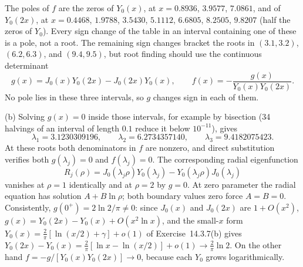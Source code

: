 The poles of $f$ are the zeros of $Y_0(x)$, at
$x=0.8936$, $3.9577$, $7.0861$, and of $Y_0(2x)$, at
$x=0.4468$, $1.9788$, $3.5430$, $5.1112$, $6.6805$, $8.2505$,
$9.8207$ (half the zeros of $Y_0$). Every sign change of the table
in an interval containing one of these is a pole, not a root. The
remaining sign changes bracket the roots in $(3.1,3.2)$,
$(6.2,6.3)$, and $(9.4,9.5)$, but root finding should use the
continuous determinant
\[
g(x)=J_0(x)Y_0(2x)-J_0(2x)Y_0(x),\qquad
f(x)=-\frac{g(x)}{Y_0(x)Y_0(2x)}.
\]
No pole lies in these three intervals, so $g$ changes sign in each
of them.

(b) Solving $g(x)=0$ inside those intervals, for example by
bisection (34 halvings of an interval of length $0.1$ reduce it below
$10^{-11}$), gives
\[
\boxed{\lambda_1=3.1230309196,\qquad
\lambda_2=6.2734357140,\qquad
\lambda_3=9.4182075423}.
\]
At these roots both denominators in $f$ are nonzero, and direct
substitution verifies both $g(\lambda_j)=0$ and $f(\lambda_j)=0$.
The corresponding radial eigenfunction
\[
R_j(\rho)=J_0(\lambda_j\rho)Y_0(\lambda_j)
-Y_0(\lambda_j\rho)J_0(\lambda_j)
\]
vanishes at $\rho=1$ identically and at $\rho=2$ by $g=0$.
At zero parameter the radial equation has solution $A+B\ln\rho$;
both boundary values zero force $A=B=0$. Consistently,
$g(0^+)=2\ln2/\pi\ne0$: since $J_0(x)$ and $J_0(2x)$ are $1+O(x^2)$,
$g(x)=Y_0(2x)-Y_0(x)+O(x^2\ln x)$, and the small-$x$ form
$Y_0(x)=\frac2\pi[\ln(x/2)+\gamma]+o(1)$ of Exercise~14.3.7(b) gives
$Y_0(2x)-Y_0(x)=\frac2\pi[\ln x-\ln(x/2)]+o(1)\to\frac2\pi\ln2$.
On the other hand $f=-g/[Y_0(x)Y_0(2x)]\to0$, because each $Y_0$
grows logarithmically.

